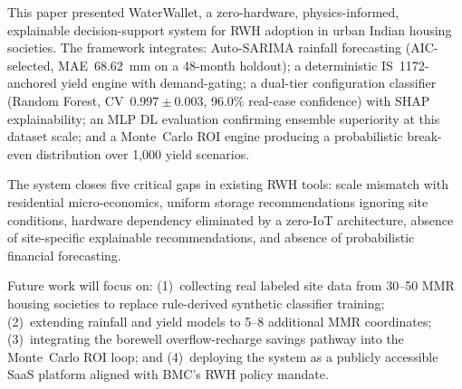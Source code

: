 \documentclass[conference]{IEEEtran}
\begin{document}
This paper presented WaterWallet, a zero-hardware, physics-informed,
explainable decision-support system for RWH adoption in urban Indian housing
societies. The framework integrates: Auto-SARIMA rainfall forecasting
(AIC-selected, MAE~68.62~mm on a 48-month holdout); a deterministic
IS~1172-anchored yield engine with demand-gating; a dual-tier configuration
classifier (Random Forest, CV~$0.997 \pm 0.003$, 96.0\% real-case
confidence) with SHAP explainability; an MLP DL evaluation confirming
ensemble superiority at this dataset scale; and a Monte~Carlo ROI engine
producing a probabilistic break-even distribution over 1,000 yield scenarios.

The system closes five critical gaps in existing RWH tools: scale mismatch
with residential micro-economics, uniform storage recommendations ignoring
site conditions, hardware dependency eliminated by a zero-IoT architecture,
absence of site-specific explainable recommendations, and absence of
probabilistic financial forecasting.

Future work will focus on: (1)~collecting real labeled site data from 30--50
MMR housing societies to replace rule-derived synthetic classifier training;
(2)~extending rainfall and yield models to 5--8 additional MMR coordinates;
(3)~integrating the borewell overflow-recharge savings pathway into the
Monte~Carlo ROI loop; and (4)~deploying the system as a publicly accessible
SaaS platform aligned with BMC's RWH policy mandate.
\end{document}

